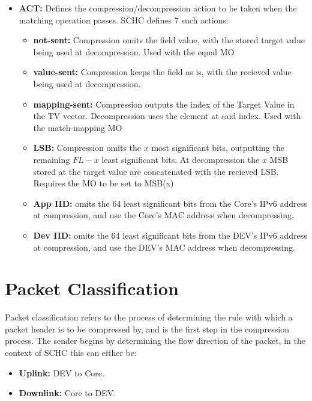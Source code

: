 \documentclass[12pt]{../dalthesis}
\begin{document}
\begin{itemize}
		\item \textbf{ACT:}
				Defines the compression/decompression action to be taken when the matching operation passes. SCHC defines 7 such actions:
				
			\begin{adjustwidth}{1em}{0em}
				\begin{itemize}
					\item \textbf{not-sent:} Compression omits the field value, with the stored target value being used at decompression. Used with the equal MO
					\item \textbf{value-sent:} Compression keeps the field as is,  with the recieved value being used at decompression.
					\item \textbf{mapping-sent:} Compression outputs the index of the Target Value in the TV vector. Decompression uses the element at said index. Used with the 
						match-mapping MO
					\item \textbf{LSB:} Compression omits the $x$ most significant bits, outputting the remaining $FL-x$ least significant bits. At decompression the $x$ MSB stored
						at the target value are concatenated with the recieved LSB. Requires the MO to be set to MSB(x) 
					
					\item \textbf{App IID:} omits the 64 least significant bits from the Core's IPv6 address at compression, and use the Core's MAC address when decompressing.
					\item \textbf{Dev IID:} omits the 64 least significant bits from the DEV's IPv6 address at compression, and use the DEV's MAC address when decompressing.

				\end{itemize}
			\end{adjustwidth}
	\end{itemize}

	\vspace{3em}
	\section{Packet Classification}
	Packet classification refers to the process of determining the rule with which a packet header is to be
	compressed by, and is the first step in the compression process. The sender begins by determining the flow direction of the packet, in the context 
	of SCHC this can either be:
	\begin{itemize}
		\item \textbf{Uplink:} DEV to Core.
		\item \textbf{Downlink:} Core to DEV.
	\end{itemize}
\end{document}

